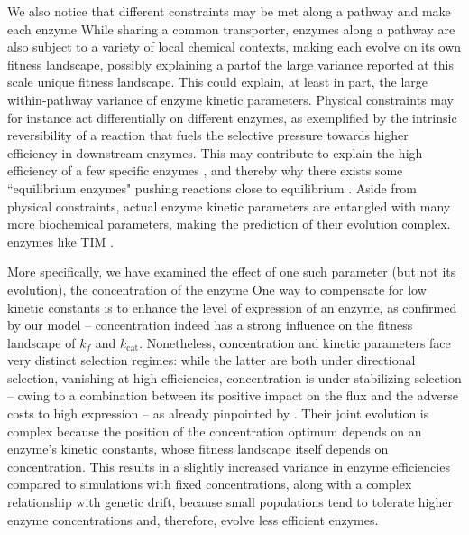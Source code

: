 \documentclass[11pt,onecolumn]{article}
\providecommand{\DIFadd}[1]{{\protect\color{blue} \sf #1}} %
\providecommand{\DIFdel}[1]{{\protect\color{red} \scriptsize #1}} %
\providecommand{\DIFaddbegin}{} %
\providecommand{\DIFaddend}{} %
\providecommand{\DIFdelbegin}{} %
\providecommand{\DIFdelend}{} %
\begin{document}
\DIFdelbegin \DIFdel{We also notice that different constraints may be met along a pathway and make each enzyme }\DIFdelend \DIFaddbegin \DIFadd{While sharing a common transporter, enzymes along a pathway are also subject to a variety of local chemical contexts, making each }\DIFaddend evolve on its own \DIFdelbegin \DIFdel{fitness landscape, possibly explaining a partof the large variance reported at this scale}\DIFdelend \DIFaddbegin \DIFadd{unique fitness landscape. This could explain, at least in part, the large within-pathway variance of enzyme kinetic parameters}\DIFaddend . Physical constraints may for instance act differentially on different enzymes, as exemplified by the intrinsic reversibility of a reaction that fuels the selective pressure towards higher efficiency in downstream enzymes. This may contribute to explain the high efficiency of a few \DIFdelbegin \DIFdel{specific enzymes , and thereby why there exists some ``equilibrium enzymes" pushing reactions close to equilibrium \citep{Williamson67,Davidi18}. Aside from physical constraints, actual enzyme kinetic parameters are entangled with many more biochemical parameters, making the prediction of their evolution complex. 
}\DIFdelend \DIFaddbegin \DIFadd{enzymes like TIM %
\citep{Williamson67,Davidi18}.
}\DIFaddend 

\DIFdelbegin \DIFdel{More specifically, we have examined the effect of one such parameter (but not its evolution), the concentration of the enzyme}\DIFdelend \DIFaddbegin \DIFadd{One way to compensate for low kinetic constants is to enhance the level of expression of an enzyme, as confirmed by our model -- concentration indeed has a strong influence on the fitness landscape of $k_f$ and $k_\text{cat}$. Nonetheless, concentration and kinetic parameters face very distinct selection regimes: while the latter are both under directional selection, vanishing at high efficiencies, concentration is under stabilizing selection -- owing to a combination between its positive impact on the flux and the adverse costs to high expression -- as already pinpointed by \citet{Chou14}. Their joint evolution is complex because the position of the concentration optimum depends on an enzyme's kinetic constants, whose fitness landscape itself depends on concentration. This results in a slightly increased variance in enzyme efficiencies compared to simulations with fixed concentrations, along with a complex relationship with genetic drift, because small populations tend to tolerate higher enzyme concentrations and, therefore, evolve less efficient enzymes.
}
\end{document}
